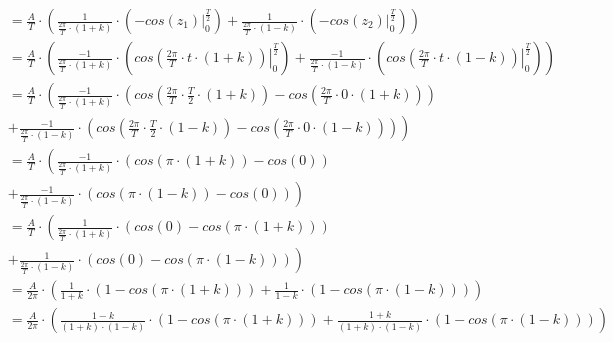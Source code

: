 \begin{align*}
&=\frac{A}{T} \cdot \left(\frac{1}{\frac{2\pi}{T}\cdot \left(1+k\right)} \cdot \left( \left. -cos\left( z_1 \right) \right|_{0}^{\frac{T}{2}} \right) + \frac{1}{\frac{2\pi}{T} \cdot \left(1-k\right)} \cdot \left(\left. -cos\left( z_2\right) \right|_{0}^{\frac{T}{2}} \right) \right)\\
&=\frac{A}{T} \cdot \left(\frac{-1}{\frac{2\pi}{T}\cdot \left(1+k\right)} \cdot \left( \left. cos\left( \frac{2\pi}{T} \cdot t \cdot \left(1+k\right) \right) \right|_{0}^{\frac{T}{2}} \right) + \frac{-1}{\frac{2\pi}{T} \cdot \left(1-k\right)} \cdot \left(\left. cos\left( \frac{2\pi}{T} \cdot t \cdot \left(1-k\right)\right) \right|_{0}^{\frac{T}{2}} \right) \right)\\
&=\frac{A}{T} \cdot \left(\frac{-1}{\frac{2\pi}{T}\cdot \left(1+k\right)} \cdot \left( cos\left( \frac{2\pi}{T} \cdot \frac{T}{2} \cdot \left(1+k\right) \right) - cos\left( \frac{2\pi}{T} \cdot 0 \cdot \left(1+k\right) \right) \right) \right.\\
&\left.+ \frac{-1}{\frac{2\pi}{T} \cdot \left(1-k\right)} \cdot \left( cos\left( \frac{2\pi}{T} \cdot \frac{T}{2} \cdot \left(1-k\right)\right) -  cos\left( \frac{2\pi}{T} \cdot 0 \cdot \left(1-k\right)\right) \right) \right)\\
&=\frac{A}{T} \cdot \left(\frac{-1}{\frac{2\pi}{T}\cdot \left(1+k\right)} \cdot \left( cos\left(\pi \cdot \left(1+k\right) \right) - cos\left( 0 \right) \right) \right.\\
&\left.+ \frac{-1}{\frac{2\pi}{T} \cdot \left(1-k\right)} \cdot \left( cos\left(\pi \cdot \left(1-k\right)\right) -  cos\left( 0 \right) \right) \right)\\
&=\frac{A}{T} \cdot \left(\frac{1}{\frac{2\pi}{T}\cdot \left(1+k\right)} \cdot \left( cos\left( 0 \right) - cos\left(\pi \cdot \left(1+k\right) \right) \right) \right.\\
&\left.+ \frac{1}{\frac{2\pi}{T} \cdot \left(1-k\right)} \cdot \left( cos\left( 0 \right) - cos\left(\pi \cdot \left(1-k\right)\right) \right) \right)\\
&=\frac{A}{2\pi} \cdot \left(\frac{1}{1+k} \cdot \left( 1 - cos\left(\pi \cdot \left(1+k\right) \right) \right)+ \frac{1}{1-k} \cdot \left( 1 - cos\left(\pi \cdot \left(1-k\right)\right) \right) \right)\\
&=\frac{A}{2\pi} \cdot \left(\frac{1-k}{\left(1+k\right)\cdot\left(1-k\right)} \cdot \left( 1 - cos\left(\pi \cdot \left(1+k\right) \right) \right)+ \frac{1+k}{\left(1+k\right)\cdot\left(1-k\right)} \cdot \left( 1 - cos\left(\pi \cdot \left(1-k\right)\right) \right) \right)\\

\end{align*}
